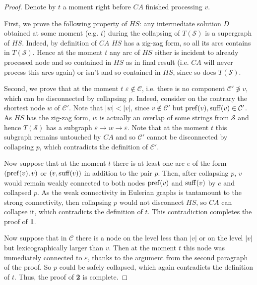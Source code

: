 \begin{proof}
    Denote by $t$ a moment right before $CA$ finished processing $v$.
    
    First, we prove the following property of $HS$: any intermediate solution $D$ obtained at some moment (e.g. $t$) during the collapsing of $T(\mathcal{S})$ is a supergraph of $HS$. Indeed, by definition of $CA$ $HS$ has a zig-zag form, so all its arcs contains in $T(\mathcal{S})$. Hence at the moment $t$ any arc of $HS$ either is incident to already processed node and so contained in $HS$ as in final result (i.e. $CA$ will never process this arcs again) or isn't and so contained in $HS$, since so does $T(\mathcal{S})$.
    
    Second, we prove that at the moment $t$ $\varepsilon \notin \mathcal{C}$, i.e. there is no component $\mathcal{C}' \not\ni v$, which can be disconnected by collapsing $p$. Indeed, consider on the contrary the shortest node $w$ of $\mathcal{C}'$. Note that $|w| < |v|$, since $v \notin \mathcal{C}'$ but $\operatorname{pref}(v), \operatorname{suff}(v) \in \mathcal{C}'$. As $HS$ has the zig-zag form, $w$ is actually an overlap of some strings from $\mathcal{S}$ and hence $T(\mathcal{S})$ has a subgraph $\varepsilon \to w \to \varepsilon$. Note that at the moment $t$ this subgraph remains untouched by $CA$ and so $\mathcal{C}'$ cannot be disconnected by collapsing $p$, which contradicts the definition of $\mathcal{C}'$.
    
    Now suppose that at the moment $t$ there is at least one arc $e$ of the form $(\operatorname{pref}(v), v)$ or $(v, \operatorname{suff}(v))$ in addition to the pair $p$. Then, after collapsing $p$, $v$ would remain weakly connected to both nodes $\operatorname{pref}(v)$ and $\operatorname{suff}(v)$ by $e$ and collapsed $p$. As the weak connectivity in Eulerian graphs is tantamount to the strong connectivity, then collapsing $p$ would not disconnect $HS$, so $CA$ can collapse it, which contradicts the definition of $t$. This contradiction completes the proof of {\bf 1}.
    
    Now suppose that in $\mathcal{C}$ there is a node on the level less than $|v|$ or on the level $|v|$ but lexicographically larger than $v$. Then at the moment $t$ this node was immediately connected to $\varepsilon$, thanks to the argument from the second paragraph of the proof. So $p$ could be safely collapsed, which again contradicts the definition of $t$. Thus, the proof of {\bf 2} is complete.
\end{proof}
